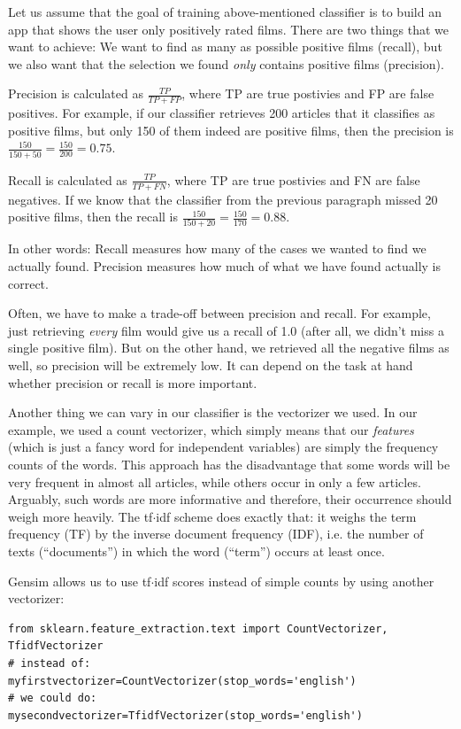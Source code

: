 \documentclass[a4paper,12pt]{book}
\begin{document}
Let us assume that the goal of training above-mentioned classifier is to build an app that shows the user only positively rated films. There are two things that we want to achieve: We want to find as many as possible positive films (recall), but we also want that the selection we found \emph{only} contains positive films (precision).

Precision is calculated as $\frac{TP}{TP+FP}$, where TP are true postivies and FP are false positives. For example, if our classifier retrieves 200 articles that it classifies as positive films, but only 150 of them indeed are positive films, then the precision is $\frac{150}{150+50} = \frac{150}{200} = 0.75$.

Recall is calculated as $\frac{TP}{TP+FN}$, where TP are true postivies and FN are false negatives. If we know that the classifier from the previous paragraph missed 20 positive films, then the recall is $\frac{150}{150+20} = \frac{150}{170}= 0.88$.

In other words: Recall measures how many of the cases we wanted to find we actually found. Precision measures how much of what we have found actually is correct.

Often, we have to make a trade-off between precision and recall. For example, just retrieving \emph{every} film would give us a recall of 1.0 (after all, we didn't miss a single positive film). But on the other hand, we retrieved all the negative films as well, so precision will be extremely low. It can depend on the task at hand whether precision or recall is more important.

Another thing we can vary in our classifier is the vectorizer we used. In our example, we used a count vectorizer, which simply means that our \emph{features} (which is just a fancy word for independent variables) are simply the frequency counts of the words. This approach has the disadvantage that some words will be very frequent in almost all articles, while others occur in only a few articles. Arguably, such words are more informative and therefore, their occurrence should weigh more heavily. The tf$\cdot$idf scheme does exactly that: it weighs the term frequency (TF) by the inverse document frequency (IDF), i.e. the number of texts (``documents'') in which the word (``term'') occurs at least once.

Gensim allows us to use tf$\cdot$idf scores instead of simple counts by using another vectorizer:

\begin{lstlisting}
from sklearn.feature_extraction.text import CountVectorizer, TfidfVectorizer
# instead of:
myfirstvectorizer=CountVectorizer(stop_words='english')
# we could do:
mysecondvectorizer=TfidfVectorizer(stop_words='english')
\end{lstlisting}
\end{document}
